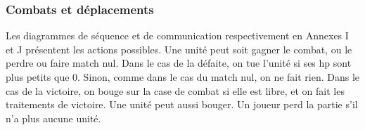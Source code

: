 \subsubsection{Combats et déplacements}
Les diagrammes de séquence et de communication respectivement en Annexes I et J présentent les actions possibles. 
Une unité peut soit gagner le combat, ou le perdre ou faire match nul. Dans le cas de la défaite, on tue l'unité si ses hp sont plus petits que 0. Sinon, comme dans le cas du match nul, on ne fait rien. Dans le cas de la victoire, on bouge sur la case de combat si elle est libre, et on fait les traitements de victoire. Une unité peut aussi bouger. Un joueur perd la partie s'il n'a plus aucune unité.